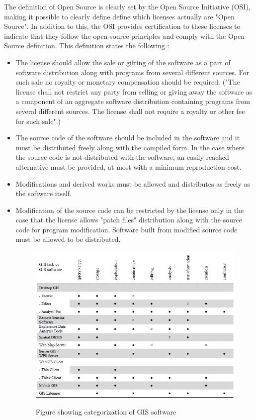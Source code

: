 The definition of Open Source is clearly set by the Open Source Initiative (OSI), making it possible to clearly define define which licenses actually are "Open Source". In addition to this, the OSI provides certification to these licenses to indicate that they follow the open-source principles and comply with the Open Source definition. This definition states the following \citep{osbook}:
\begin{itemize}
\item The license should allow the sale or gifting of the software as a part of software distribution along with programs from several different sources. For such sale no royalty or monetary compensation should be required. ("The license shall not restrict any party from selling or giving away the software as a component of an aggregate software distribution containing programs from several different sources. The license shall not require a royalty or other fee for such sale".)
\item The source code of the software should be included in the software and it must be distributed freely along with the compiled form. In the case where the source code is not distributed with the software, an easily reached alternative must be provided, at most with a minimum reproduction cost.
\item Modifications and derived works must be allowed and distributes as freely as the software itself.
\item Modification of the source code can be restricted by the license only in the case that the license allows "patch files" distribution along with the source code for program modification. Software built from modified source code must be allowed to be distributed. 

\begin{figure}[H]
\centering
	{\includegraphics[width=\linewidth]{gfx/OS.png}}
\caption{Figure showing categorization of GIS software \citep{osarticle}}
\label{fig:giscategory}
\end{figure}


\end{itemize}
